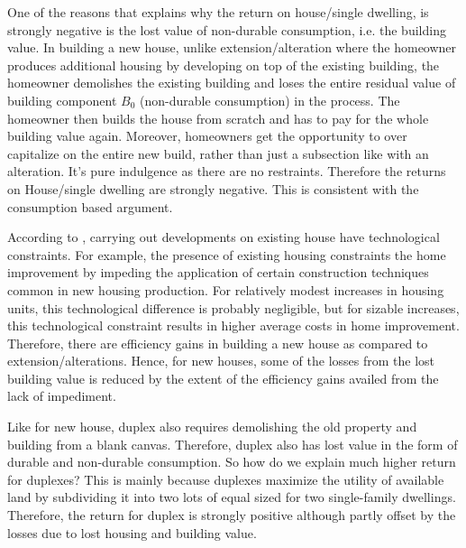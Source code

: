 \documentclass[AEJ,reqno, draftmode]{AEA} %
\begin{document}
One of the reasons that explains why the return on house/single dwelling, is strongly negative is the lost value of non-durable consumption, i.e. the building value. In building a new house, unlike extension/alteration where the homeowner produces additional housing by developing on top of the existing building, the homeowner demolishes the existing building and loses the entire residual value of building component $B_0$ (non-durable consumption) in the process. The homeowner then builds the house from scratch and has to pay for the whole building value again. Moreover, homeowners get the opportunity to over capitalize on the entire new build, rather than just a subsection like with an alteration. It's pure indulgence as there are no restraints. Therefore the returns on House/single dwelling are strongly negative. This is consistent with the consumption based argument.

According to \citet{potepan1989interest}, carrying out developments on existing house have technological constraints. For example, the presence of existing housing constraints the home improvement by impeding the application of certain construction techniques common in new housing production. For relatively modest increases in housing units, this technological difference is probably negligible, but for sizable increases, this technological constraint results in higher average costs in home improvement. Therefore, there are efficiency gains in building a new house as compared to extension/alterations. Hence, for new houses, some of the losses from the lost building value is reduced by the extent of the efficiency gains availed from the lack of impediment.

Like for new house, duplex also requires demolishing the old property and building from a blank canvas. Therefore, duplex also has lost value in the form of durable and non-durable consumption. So how do we explain much higher return for duplexes? This is mainly because duplexes maximize the utility of available land by subdividing it into two lots of equal sized for two single-family dwellings. Therefore, the return for duplex is strongly positive although partly offset by the losses due to lost housing and building value.
\end{document}
